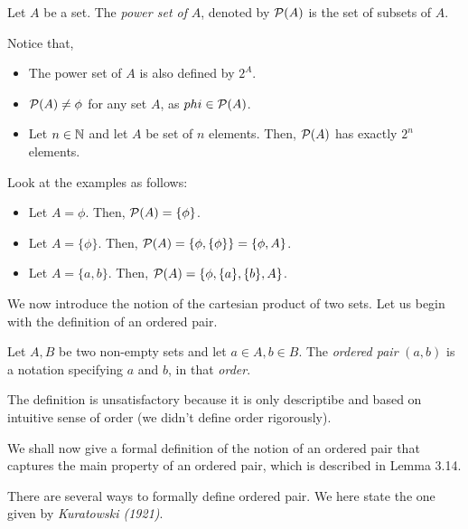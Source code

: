 \documentclass[11pt]{scrartcl}
\begin{document}
    \begin{definition}
        Let \(A\) be a set. The \emph{power set of} \(A\), denoted by \(\mathcal P(A)\) is the set of subsets of \(A\).
    \end{definition}
    \begin{remark}
        Notice that,
        \begin{itemize}
            \item The power set of \(A\) is also defined by \(2^A\).
            \item \(\mathcal P(A) \neq \phi\) for any set \(A\), as \(phi \in \mathcal P(A)\).
            \item Let \(n \in \mathbb N\) and let \(A\) be set of \(n\) elements. Then, \(\mathcal P(A)\) has exactly \(2^{n}\) elements.
        \end{itemize}
    \end{remark}
    \begin{example}
        Look at the examples as follows:
        \begin{itemize}
            \item Let \(A = \phi\). Then, \(\mathcal P(A) = \{\phi\}\).
            \item Let \(A = \{\phi\}\). Then, \(\mathcal P(A) = \{\phi, \{\phi\}\} = \{\phi, A\}\).
            \item Let \(A = \{a, b\}\). Then, \(\mathcal P(A) = \{\phi, \{a\}, \{b\}, A\}\).
        \end{itemize}
    \end{example}
    We now introduce the notion of the cartesian product of two sets. Let us begin with the definition of an ordered pair.
    \begin{definition}
        Let \(A, B\) be two non-empty sets and let \(a \in A, b \in B\). The \emph{ordered pair} \((a, b)\) is a notation specifying \(a\) and \(b\), in that \emph{order}.
    \end{definition}
    \begin{remark}
        The definition is unsatisfactory because it is only descriptibe and based on intuitive sense of order (we didn't define order rigorously).

        We shall now give a formal definition of the notion of an ordered pair that captures the main property of an ordered pair, which is described in Lemma 3.14.

        There are several ways to formally define ordered pair. We here state the one given by \emph{Kuratowski (1921)}.
    \end{remark}
\end{document}
